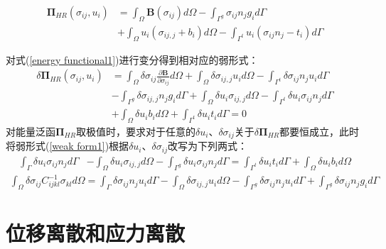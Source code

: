\begin{equation}\label{energy functional1}
\begin{split}
    \pmb{\Pi}_{H\!R}(\sigma_{ij},u_i)&=\int_{\Omega}\pmb{B}(\sigma_{ij})d\Omega-\int_{\Gamma^g}\sigma_{ij}n_jg_id\Gamma\\
    &+\int_{\Omega}u_i(\sigma_{ij,j}+b_i)d\Omega-\int_{\Gamma^t}u_i(\sigma_{ij}n_j-t_i)d\Gamma
\end{split}
\end{equation}\par
对式(\ref{energy functional1})进行变分得到相对应的弱形式：
\begin{equation}\label{weak form1}
\begin{split} 
    \delta\pmb{\Pi}_{H\!R}(\sigma_{ij},u_i)&=\int_{\Omega}\delta\sigma_{ij}\frac{\partial\pmb{B}}{\partial \sigma_{ij}}d\Omega+\int_{\Omega}\delta\sigma_{ij,j}u_id\Omega-\int_{\Gamma^t}\delta\sigma_{ij}n_ju_id\Gamma\\
    &-\int_{\Gamma^g}\delta\sigma_{ij,j}n_jg_id\Gamma+\int_{\Omega}\delta u_i\sigma_{ij,j}d\Omega- \int_{\Gamma^t}\delta u_i\sigma_{ij}n_jd\Gamma\\
    &+\int_{\Omega}\delta u_ib_id\Omega+\int_{\Gamma^t}\delta u_it_id\Gamma=0
\end{split}
\end{equation}
对能量泛函$\pmb{\Pi}_{H\!R}$取极值时，要求对于任意的$\delta u_i$、$\delta\sigma_{ij}$关于$\delta\pmb{\Pi}_{H\!R}$都要恒成立，此时将弱形式(\ref{weak form1})根据$\delta u_i$、$\delta\sigma_{ij}$改写为下列两式：
\begin{equation}
\begin{split}
    \int_{\Gamma}\delta u_i\sigma_{ij}n_jd\Gamma&-\int_{\Omega}\delta u_i\sigma_{ij,j}d\Omega-\int_{\Gamma^g}\delta u_i\sigma_{ij}n_jd\Gamma
    =\int_{\Gamma^t}\delta u_it_id\Gamma+\int_{\Omega}\delta u_ib_id\Omega
\end{split}
\end{equation} 
\begin{equation}
\begin{split}
    \int_{\Omega}\delta\sigma_{ij}C^{-1}_{ijkl}\sigma_{kl}d\Omega=\int_{\Gamma}\delta\sigma_{ij}n_ju_id\Gamma-\int_{\Omega}\delta\sigma_{ij,j}u_id\Omega
    -\int_{\Gamma^g}\delta\sigma_{ij}n_ju_id\Gamma+\int_{\Gamma^g}\delta\sigma_{ij}n_jg_id\Gamma
\end{split}
\end{equation}    
\section{位移离散和应力离散}
